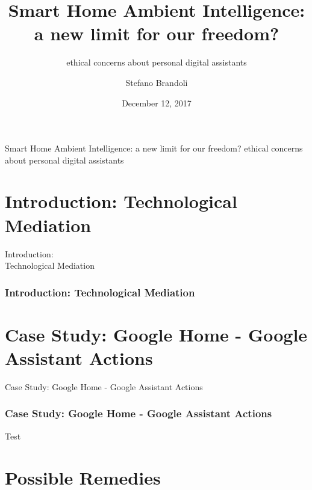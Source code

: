 \documentclass{beamer}
\title{Smart Home Ambient Intelligence: \\a new limit for our freedom?}
\subtitle{\vspace*{0.7cm}ethical concerns about personal digital assistants}
\author[Stefano Brandoli]{Stefano Brandoli}
\institute[PoliMi]{Politecnico di Milano}
\date{December 12, 2017}
\begin{document}
\begin{frame}
\maketitle
\end{frame}

\begin{frame}
\begin{center}{\vspace*{-0.5cm}Smart Home Ambient Intelligence: a new limit for our freedom?
ethical concerns about personal digital assistants}
\end{center}


\tableofcontents
\end{frame}

\section{Introduction: Technological Mediation}

\begin{frame}
\begin{center}
	 Introduction:\\Technological Mediation
\end{center}
\end{frame}

\begin{frame}
\frametitle{Introduction: Technological Mediation}

\end{frame}

\section{Case Study: Google Home - Google Assistant Actions}

\begin{frame}
\begin{center} 
	 Case Study: Google Home - Google Assistant Actions
\end{center}
\end{frame}

\begin{frame}
\frametitle{Case Study: Google Home - Google Assistant Actions}
Test
\end{frame}

\section{Possible Remedies}
\end{document}
